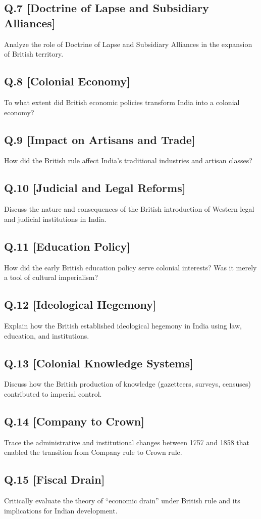 \subsection*{Q.7 [Doctrine of Lapse and Subsidiary Alliances]}
Analyze the role of Doctrine of Lapse and Subsidiary Alliances in the expansion of British territory.

\subsection*{Q.8 [Colonial Economy]}
To what extent did British economic policies transform India into a colonial economy?

\subsection*{Q.9 [Impact on Artisans and Trade]}
How did the British rule affect India’s traditional industries and artisan classes?

\subsection*{Q.10 [Judicial and Legal Reforms]}
Discuss the nature and consequences of the British introduction of Western legal and judicial institutions in India.

\subsection*{Q.11 [Education Policy]}
How did the early British education policy serve colonial interests? Was it merely a tool of cultural imperialism?

\subsection*{Q.12 [Ideological Hegemony]}
Explain how the British established ideological hegemony in India using law, education, and institutions.

\subsection*{Q.13 [Colonial Knowledge Systems]}
Discuss how the British production of knowledge (gazetteers, surveys, censuses) contributed to imperial control.

\subsection*{Q.14 [Company to Crown]}
Trace the administrative and institutional changes between 1757 and 1858 that enabled the transition from Company rule to Crown rule.

\subsection*{Q.15 [Fiscal Drain]}
Critically evaluate the theory of “economic drain” under British rule and its implications for Indian development.
